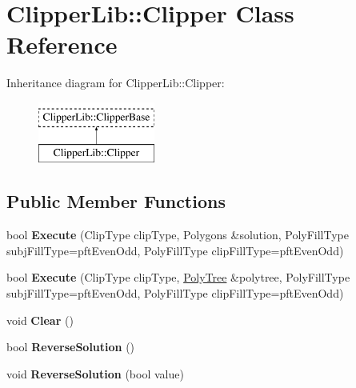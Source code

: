 \hypertarget{classClipperLib_1_1Clipper}{\section{Clipper\-Lib\-:\-:Clipper Class Reference}
\label{classClipperLib_1_1Clipper}
}
Inheritance diagram for Clipper\-Lib\-:\-:Clipper\-:\begin{figure}[H]
\begin{center}
\leavevmode
\includegraphics[height=2.000000cm]{classClipperLib_1_1Clipper}
\end{center}
\end{figure}
\subsection*{Public Member Functions}
\begin{DoxyCompactItemize}
\item 
\hypertarget{classClipperLib_1_1Clipper_a674d5d300c73a4da99bc36a7ecde0618}{bool {\bfseries Execute} (Clip\-Type clip\-Type, Polygons \&solution, Poly\-Fill\-Type subj\-Fill\-Type=pft\-Even\-Odd, Poly\-Fill\-Type clip\-Fill\-Type=pft\-Even\-Odd)}\label{classClipperLib_1_1Clipper_a674d5d300c73a4da99bc36a7ecde0618}

\item 
\hypertarget{classClipperLib_1_1Clipper_aceb19a1e5a5c9e31067f4d1177793403}{bool {\bfseries Execute} (Clip\-Type clip\-Type, \hyperlink{classClipperLib_1_1PolyTree}{Poly\-Tree} \&polytree, Poly\-Fill\-Type subj\-Fill\-Type=pft\-Even\-Odd, Poly\-Fill\-Type clip\-Fill\-Type=pft\-Even\-Odd)}\label{classClipperLib_1_1Clipper_aceb19a1e5a5c9e31067f4d1177793403}

\item 
\hypertarget{classClipperLib_1_1Clipper_a4f4576bad48bce34a36e6806623abd7a}{void {\bfseries Clear} ()}\label{classClipperLib_1_1Clipper_a4f4576bad48bce34a36e6806623abd7a}

\item 
\hypertarget{classClipperLib_1_1Clipper_ad556ba9961f498de02d55dc95bc5a889}{bool {\bfseries Reverse\-Solution} ()}\label{classClipperLib_1_1Clipper_ad556ba9961f498de02d55dc95bc5a889}

\item 
\hypertarget{classClipperLib_1_1Clipper_a44afc0c82a1d2607829b5fd21f7644ef}{void {\bfseries Reverse\-Solution} (bool value)}\label{classClipperLib_1_1Clipper_a44afc0c82a1d2607829b5fd21f7644ef}

\end{DoxyCompactItemize}
